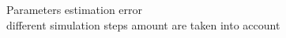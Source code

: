 \documentclass{article}
\begin{document}
\noindent
\begin{figure}[H]
    \captionsetup{justification=centering}
    \noindent{}
    \caption{Parameters estimation error \\ different simulation steps amount are taken into account}
    \label{fig:param_estim_error}
\end{figure}
\end{document}
